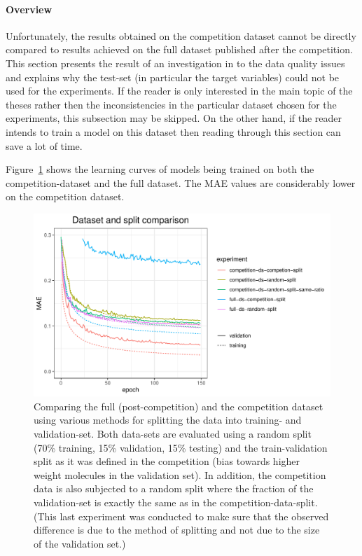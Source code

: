 
\paragraph{Overview} Unfortunately, the results obtained on the competition dataset cannot be directly compared to results achieved on the full dataset published after the competition. This section presents the result of an investigation in to the data quality issues and explains why the test-set (in particular the target variables) could not be used for the experiments. If the reader is only interested in the main topic of the theses rather then the inconsistencies in the particular dataset chosen for the experiments, this subsection may be skipped. On the other hand, if the reader intends to train a model on this dataset then reading through this section can save a lot of time.

Figure~\ref{fig:competition-vs-full-ds} shows the learning curves of models being trained on both the competition-dataset and the full dataset. The MAE values are considerably lower on the competition dataset.


\begin{figure}[H]
	\includegraphics[width=\linewidth]{figures/competition-vs-full-ds}
	\caption{Comparing the full (post-competition) and the competition dataset using various methods for splitting the data into training- and validation-set. Both data-sets are evaluated using a random split (70\% training, 15\% validation, 15\% testing) and the train-validation split as it was defined in the competition (bias towards higher weight molecules in the validation set). In addition, the competition data is also subjected to a random split where the fraction of the validation-set is exactly the same as in the competition-data-split. (This last experiment was conducted to make sure that the observed difference is due to the method of splitting and not due to the size of the validation set.)}
	\label{fig:competition-vs-full-ds}
\end{figure}

